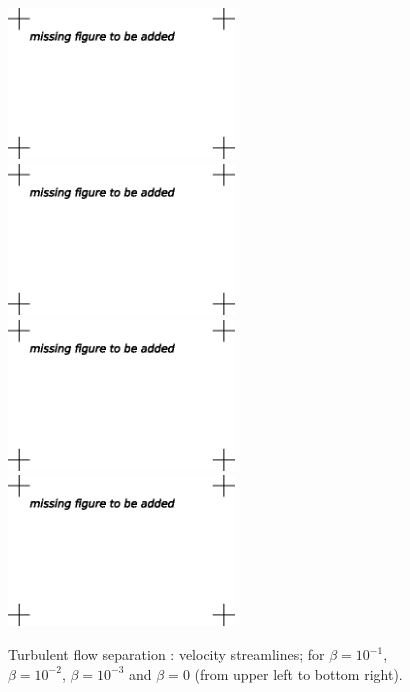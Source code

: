 \begin{figure}
\centering
\includegraphics[height=4cm]{chapters/hoffman-1/eps/Hoffman_fig5a.eps}
\includegraphics[height=4cm]{chapters/hoffman-1/eps/Hoffman_fig5b.eps}
\includegraphics[height=4cm]{chapters/hoffman-1/eps/Hoffman_fig5c.eps}
\includegraphics[height=4cm]{chapters/hoffman-1/eps/Hoffman_fig5d.eps}
\caption{Turbulent flow separation \cite{JanssonHoffman2009}: velocity streamlines; for $\beta = 10^{-1}$, $\beta = 10^{-2}$, $\beta = 10^{-3}$ and $\beta = 0$ (from upper left to bottom right).}
\label{fig:3}
\end{figure}

